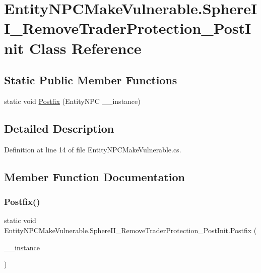 \hypertarget{class_entity_n_p_c_make_vulnerable_1_1_sphere_i_i___remove_trader_protection___post_init}{}\section{Entity\+N\+P\+C\+Make\+Vulnerable.\+Sphere\+I\+I\+\_\+\+Remove\+Trader\+Protection\+\_\+\+Post\+Init Class Reference}
\label{class_entity_n_p_c_make_vulnerable_1_1_sphere_i_i___remove_trader_protection___post_init}
\subsection*{Static Public Member Functions}
\begin{DoxyCompactItemize}
\item 
static void \mbox{\hyperlink{class_entity_n_p_c_make_vulnerable_1_1_sphere_i_i___remove_trader_protection___post_init_a6326c2672e40b402cc76784ee2143049}{Postfix}} (Entity\+N\+PC \+\_\+\+\_\+instance)
\end{DoxyCompactItemize}


\subsection{Detailed Description}


Definition at line 14 of file Entity\+N\+P\+C\+Make\+Vulnerable.\+cs.



\subsection{Member Function Documentation}
\mbox{\label{class_entity_n_p_c_make_vulnerable_1_1_sphere_i_i___remove_trader_protection___post_init_a6326c2672e40b402cc76784ee2143049}} 
\subsubsection{\texorpdfstring{Postfix()}{Postfix()}}
{\footnotesize\ttfamily static void Entity\+N\+P\+C\+Make\+Vulnerable.\+Sphere\+I\+I\+\_\+\+Remove\+Trader\+Protection\+\_\+\+Post\+Init.\+Postfix (\begin{DoxyParamCaption}\item[{Entity\+N\+PC}]{\+\_\+\+\_\+instance }\end{DoxyParamCaption})\hspace{0.3cm}{\ttfamily [static]}}



